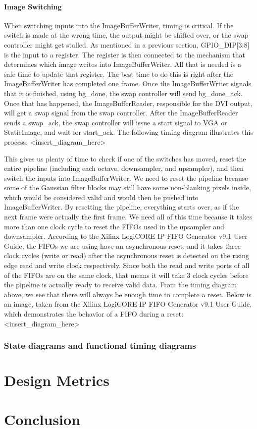 \documentclass[12pt]{article}
\begin{document}
\paragraph{Image Switching}
When switching inputs into the ImageBufferWriter, timing is critical. If the 
switch is made at the wrong time, the output might be shifted over, or the swap 
controller might get stalled. As mentioned in a previous section, GPIO\_DIP[3:8] 
is the input to a register. The register is then connected to the mechanism that 
determines which image writes into ImageBufferWriter. All that is needed is 
a safe time to update that register. The best time to do this is right after the 
ImageBufferWriter has completed one frame. Once the ImageBufferWriter signals 
that it is finished, using bg\_done, the swap controller will send bg\_done\_ack. 
Once that has happened, the ImageBufferReader, responsible for the DVI output, 
will get a swap signal from the swap controller. After the ImageBufferReader 
sends a swap\_ack, the swap controller will issue a start signal to VGA or 
StaticImage, and wait for start\_ack. The following timing diagram illustrates 
this process: <insert\_diagram\_here>

This gives us plenty of time to check if one of the switches has moved, reset 
the entire pipeline (including each octave, downsampler, and upsampler), and 
then switch the inputs into ImageBufferWriter. We need to reset the pipeline 
because some of the Gaussian filter blocks may still have some non-blanking 
pixels inside, which would be considered valid and would then be pushed into 
ImageBufferWriter. By resetting the pipeline, everything starts over, as if the 
next frame were actually the first frame. We need all of this time because it 
takes more than one clock cycle to reset the FIFOs used in the upsampler and 
downsampler. According to the Xilinx LogiCORE IP FIFO Generator v9.1 User Guide, 
the FIFOs we are using have an asynchronous reset, and it takes three clock 
cycles (write or read) after the asynchronous reset is detected on the rising 
edge read and write clock respectively. Since both the read and write ports 
of all of the FIFOs are on the same clock, that means it will take 3 clock 
cycles before the pipeline is actually ready to receive valid data. From the 
timing diagram above, we see that there will always be enough time to complete 
a reset. Below is an image, taken from the Xilinx LogiCORE IP FIFO Generator 
v9.1 User Guide, which demonstrates the behavior of a FIFO during a reset: 
<insert\_diagram\_here>

\subsubsection{State diagrams and functional timing diagrams}

\section{Design Metrics}

\section{Conclusion}
\end{document}
